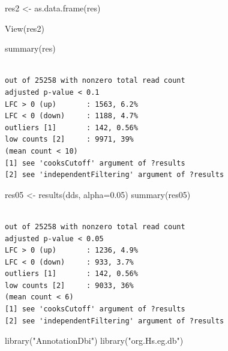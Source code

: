 \documentclass[
  letterpaper,
  DIV=11,
  numbers=noendperiod]{scrartcl}
\newenvironment{Shaded}{\begin{snugshade}}{\end{snugshade}}
\newcommand{\AttributeTok}[1]{\textcolor[rgb]{0.40,0.45,0.13}{#1}}
\newcommand{\FloatTok}[1]{\textcolor[rgb]{0.68,0.00,0.00}{#1}}
\newcommand{\FunctionTok}[1]{\textcolor[rgb]{0.28,0.35,0.67}{#1}}
\newcommand{\NormalTok}[1]{\textcolor[rgb]{0.00,0.23,0.31}{#1}}
\newcommand{\OtherTok}[1]{\textcolor[rgb]{0.00,0.23,0.31}{#1}}
\newcommand{\StringTok}[1]{\textcolor[rgb]{0.13,0.47,0.30}{#1}}
\begin{document}
\begin{Shaded}
\begin{Highlighting}[]
\NormalTok{res2 }\OtherTok{\textless{}{-}} \FunctionTok{as.data.frame}\NormalTok{(res)}

\FunctionTok{View}\NormalTok{(res2)}
\end{Highlighting}
\end{Shaded}

\begin{Shaded}
\begin{Highlighting}[]
\FunctionTok{summary}\NormalTok{(res)}
\end{Highlighting}
\end{Shaded}

\begin{verbatim}

out of 25258 with nonzero total read count
adjusted p-value < 0.1
LFC > 0 (up)       : 1563, 6.2%
LFC < 0 (down)     : 1188, 4.7%
outliers [1]       : 142, 0.56%
low counts [2]     : 9971, 39%
(mean count < 10)
[1] see 'cooksCutoff' argument of ?results
[2] see 'independentFiltering' argument of ?results
\end{verbatim}

\begin{Shaded}
\begin{Highlighting}[]
\NormalTok{res05 }\OtherTok{\textless{}{-}} \FunctionTok{results}\NormalTok{(dds, }\AttributeTok{alpha=}\FloatTok{0.05}\NormalTok{)}
\FunctionTok{summary}\NormalTok{(res05)}
\end{Highlighting}
\end{Shaded}

\begin{verbatim}

out of 25258 with nonzero total read count
adjusted p-value < 0.05
LFC > 0 (up)       : 1236, 4.9%
LFC < 0 (down)     : 933, 3.7%
outliers [1]       : 142, 0.56%
low counts [2]     : 9033, 36%
(mean count < 6)
[1] see 'cooksCutoff' argument of ?results
[2] see 'independentFiltering' argument of ?results
\end{verbatim}

\begin{Shaded}
\begin{Highlighting}[]
\FunctionTok{library}\NormalTok{(}\StringTok{"AnnotationDbi"}\NormalTok{)}
\FunctionTok{library}\NormalTok{(}\StringTok{"org.Hs.eg.db"}\NormalTok{)}
\end{Highlighting}
\end{Shaded}
\end{document}

